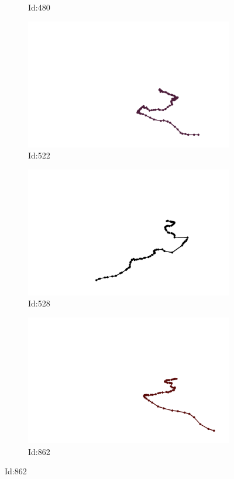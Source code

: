 \documentclass[12pt,twoside]{report}
\begin{document}
\begin{figure}
\begin{subfigure}[b]{0.20\textwidth}
\caption{Id:480}
\end{subfigure}
\begin{subfigure}[b]{0.20\textwidth}
\centering
\includegraphics[width=\textwidth]{../../trajectories/522.png}
\caption{Id:522}
\end{subfigure}
\begin{subfigure}[b]{0.20\textwidth}
\centering
\includegraphics[width=\textwidth]{../../trajectories/528.png}
\caption{Id:528}
\end{subfigure}
\begin{subfigure}[b]{0.20\textwidth}
\centering
\includegraphics[width=\textwidth]{../../trajectories/862.png}
\caption{Id:862}
\end{subfigure}
\end{figure}
\end{document}
